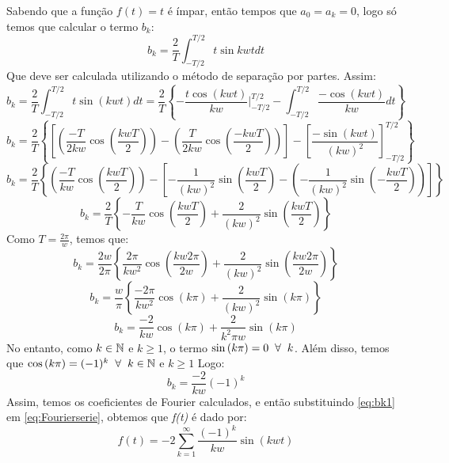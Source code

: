 Sabendo que a função $f(t)=t$ é ímpar, então tempos que $a_0 = a_k = 0$, logo só temos que calcular o termo $b_k$:
\begin{equation*}
    b_k = \frac{2}{T}\int_{-T/2}^{T/2}t\sin{kwt}dt
\end{equation*}
Que deve ser calculada utilizando o método de separação por partes. Assim:
\begin{equation*}
    b_k = \frac{2}{T}\int_{-T/2}^{T/2}t\sin{(kwt)}dt = \frac{2}{T}\left\{-\frac{t\cos{(kwt)}}{kw}|^{T/2}_{-T/2} - \int_{-T/2}^{T/2}\frac{-\cos{(kwt)}}{kw}dt\right\}
\end{equation*}
\begin{equation*}
    b_k = \frac{2}{T}\left\{\left[\left(\frac{-T}{2kw}\cos{\left(\frac{kwT}{2}\right)}\right) - \left(\frac{T}{2kw}\cos{\left(\frac{-kwT}{2}\right)}\right)\right] - \left[\frac{-\sin{(kwt)}}{(kw)^2}\right]_{-T/2}^{T/2}\right\}
\end{equation*}
\begin{equation*}
    b_k = \frac{2}{T}\left\{\left(\frac{-T}{kw}\cos{\left(\frac{kwT}{2}\right)}\right) - \left[-\frac{1}{(kw)^2}\sin{\left(\frac{kwT}{2}\right)}-\left(-\frac{1}{(kw)^2}\sin{\left(-\frac{kwT}{2}\right)}\right)\right]\right\}
\end{equation*}
\begin{equation*}
    b_k = \frac{2}{T}\left\{-\frac{T}{kw}\cos{\left(\frac{kwT}{2}\right)} + \frac{2}{(kw)^2}\sin{\left(\frac{kwT}{2}\right)}\right\}
\end{equation*}
Como $T = \frac{2\pi}{w}$, temos que:
\begin{equation*}
    b_k = \frac{2w}{2\pi}\left\{\frac{2\pi}{kw^2}\cos{\left(\frac{kw2\pi}{2w}\right)} + \frac{2}{(kw)^2}\sin{\left(\frac{kw2\pi}{2w}\right)}\right\}
\end{equation*}
\begin{equation*}
    b_k = \frac{w}{\pi}\left\{\frac{-2\pi}{kw^2}\cos{(k\pi)} + \frac{2}{(kw)^2}\sin{(k\pi)}\right\}
\end{equation*}
\begin{equation*}
    b_k = \frac{-2}{kw}\cos{(k\pi)} + \frac{2}{k^2\pi w}\sin{(k\pi)}
\end{equation*}
No entanto, como $k\in\mathbb{N}$ e $k\geq1$, o termo $\sin{(k\pi) = 0 \hspace{0.2cm}\forall \hspace{0.2cm} k}$. Além disso, temos que $\cos{(k\pi)} = (-1)^k \hspace{0.2cm} \forall \hspace{0.2cm} k \in \mathbb{N}$ e $k\geq1$ Logo:
\begin{equation}
    \label{eq:bk1}
    b_k = \frac{-2}{kw}(-1)^k
\end{equation}
Assim, temos os coeficientes de Fourier calculados, e então substituindo \ref{eq:bk1} em \ref{eq:Fourierserie}, obtemos que \textit{f(t)} é dado por:
\begin{equation*}
    \boxed{f(t) = -2\sum_{k=1}^{\infty} \frac{(-1)^k}{kw}\sin{(kwt)}}
\end{equation*}